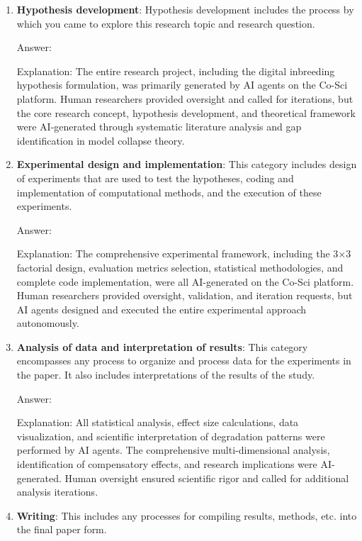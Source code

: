 \documentclass{article}
\begin{document}
\begin{enumerate}
    \item \textbf{Hypothesis development}: Hypothesis development includes the process by which you came to explore this research topic and research question.

    Answer: \involvementC{} %
    
    Explanation: The entire research project, including the digital inbreeding hypothesis formulation, was primarily generated by AI agents on the Co-Sci platform. Human researchers provided oversight and called for iterations, but the core research concept, hypothesis development, and theoretical framework were AI-generated through systematic literature analysis and gap identification in model collapse theory.

    \item \textbf{Experimental design and implementation}: This category includes design of experiments that are used to test the hypotheses, coding and implementation of computational methods, and the execution of these experiments.

    Answer: \involvementC{} %
    
    Explanation: The comprehensive experimental framework, including the 3×3 factorial design, evaluation metrics selection, statistical methodologies, and complete code implementation, were all AI-generated on the Co-Sci platform. Human researchers provided oversight, validation, and iteration requests, but AI agents designed and executed the entire experimental approach autonomously.

    \item \textbf{Analysis of data and interpretation of results}: This category encompasses any process to organize and process data for the experiments in the paper. It also includes interpretations of the results of the study.

    Answer: \involvementC{} %
    
    Explanation: All statistical analysis, effect size calculations, data visualization, and scientific interpretation of degradation patterns were performed by AI agents. The comprehensive multi-dimensional analysis, identification of compensatory effects, and research implications were AI-generated. Human oversight ensured scientific rigor and called for additional analysis iterations.

    \item \textbf{Writing}: This includes any processes for compiling results, methods, etc. into the final paper form.


\end{enumerate}
\end{document}
